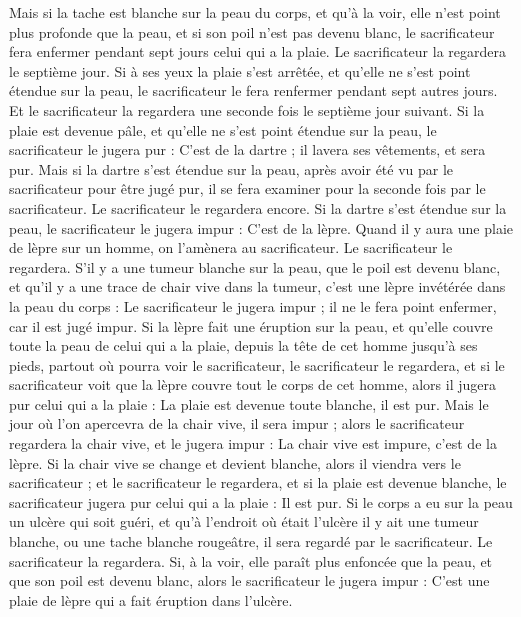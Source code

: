 \begin{multicols}{2}
Mais si la tache est blanche sur la peau du corps, et qu'à la voir, elle n’est point plus profonde que la peau, et si son poil n’est pas devenu blanc, le sacrificateur fera enfermer pendant sept jours celui qui a la plaie.
Le sacrificateur la regardera le septième jour. Si à ses yeux la plaie s’est arrêtée, et qu'elle ne s’est point étendue sur la peau, le sacrificateur le fera renfermer pendant sept autres jours.
Et le sacrificateur la regardera une seconde fois le septième jour suivant. Si la plaie est devenue pâle, et qu'elle ne s'est point étendue sur la peau, le sacrificateur le jugera pur : C'est de la dartre ; il lavera ses vêtements, et sera pur.
Mais si la dartre s’est étendue sur la peau, après avoir été vu par le sacrificateur pour être jugé pur, il se fera examiner pour la seconde fois par le sacrificateur.
Le sacrificateur le regardera encore. Si la dartre s’est étendue sur la peau, le sacrificateur le jugera impur : C'est de la lèpre.
Quand il y aura une plaie de lèpre sur un homme, on l'amènera au sacrificateur.
Le sacrificateur le regardera. S’il y a une tumeur blanche sur la peau, que le poil est devenu blanc, et qu'il y a une trace de chair vive dans la tumeur,
c'est une lèpre invétérée dans la peau du corps : Le sacrificateur le jugera impur ; il ne le fera point enfermer, car il est jugé impur.
Si la lèpre fait une éruption sur la peau, et qu'elle couvre toute la peau de celui qui a la plaie, depuis la tête de cet homme jusqu'à ses pieds, partout où pourra voir le sacrificateur, le sacrificateur le regardera,
et si le sacrificateur voit que la lèpre couvre tout le corps de cet homme, alors il jugera pur celui qui a la plaie : La plaie est devenue toute blanche, il est pur.
Mais le jour où l’on apercevra de la chair vive, il sera impur ;
alors le sacrificateur regardera la chair vive, et le jugera impur : La chair vive est impure, c'est de la lèpre.
Si la chair vive se change et devient blanche, alors il viendra vers le sacrificateur ;
et le sacrificateur le regardera, et si la plaie est devenue blanche, le sacrificateur jugera pur celui qui a la plaie : Il est pur.
Si le corps a eu sur la peau un ulcère qui soit guéri,
et qu'à l'endroit où était l'ulcère il y ait une tumeur blanche, ou une tache blanche rougeâtre, il sera regardé par le sacrificateur.
Le sacrificateur la regardera. Si, à la voir, elle paraît plus enfoncée  que la peau, et que son poil est devenu blanc, alors le sacrificateur le jugera impur : C'est une plaie de lèpre qui a fait éruption dans l'ulcère.

\end{multicols}
